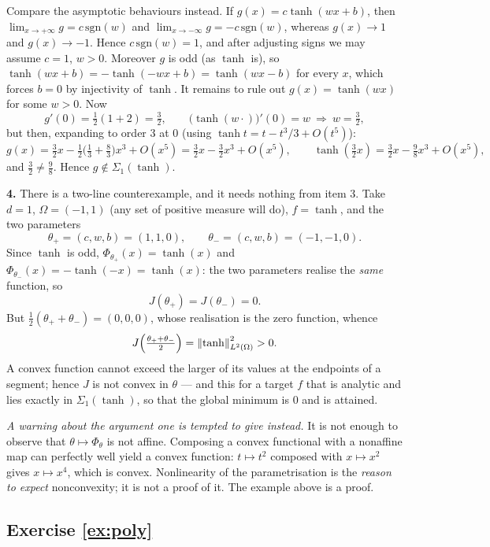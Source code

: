 \documentclass[11pt,a4paper]{article}
\begin{document}
Compare the asymptotic behaviours instead. If $g(x) = c\tanh(wx+b)$, then
$\lim_{x\to+\infty} g = c\,\mathrm{sgn}(w)$ and $\lim_{x \to -\infty} g = -c\,\mathrm{sgn}(w)$,
whereas $g(x) \to 1$ and $g(x) \to -1$. Hence $c\,\mathrm{sgn}(w) = 1$, and after adjusting signs we
may assume $c = 1$, $w > 0$. Moreover $g$ is odd (as $\tanh$ is), so
$\tanh(wx+b) = -\tanh(-wx+b) = \tanh(wx - b)$ for every $x$, which forces $b = 0$ by injectivity of
$\tanh$. It remains to rule out $g(x) = \tanh(wx)$ for some $w > 0$. Now
\[
g'(0) = \tfrac12(1 + 2) = \tfrac32, \qquad \big(\tanh(w\cdot)\big)'(0) = w \ \Longrightarrow\ w = \tfrac32,
\]
but then, expanding to order $3$ at $0$ (using $\tanh t = t - t^3/3 + O(t^5)$):
\[
g(x) = \tfrac32 x - \tfrac12\big(\tfrac{1}{3} + \tfrac{8}{3}\big) x^3 + O(x^5) = \tfrac32 x - \tfrac32 x^3 + O(x^5),
\qquad
\tanh(\tfrac32 x) = \tfrac32 x - \tfrac{9}{8}x^3 + O(x^5),
\]
and $\tfrac32 \ne \tfrac98$. Hence $g \notin \Sigma_1(\tanh)$.

\textbf{4.} There is a two-line counterexample, and it needs nothing from item 3. Take $d = 1$,
$\Omega = (-1,1)$ (any set of positive measure will do), $f = \tanh$, and the two parameters
\[
\theta_+ = (c,w,b) = (1,1,0), \qquad \theta_- = (c,w,b) = (-1,-1,0).
\]
Since $\tanh$ is odd, $\Phi_{\theta_+}(x) = \tanh(x)$ and
$\Phi_{\theta_-}(x) = -\tanh(-x) = \tanh(x)$: the two parameters realise the \emph{same} function,
so
\[
J(\theta_+) = J(\theta_-) = 0 .
\]
But $\tfrac12(\theta_+ + \theta_-) = (0,0,0)$, whose realisation is the zero function, whence
\[
J\Big( \tfrac{\theta_+ + \theta_-}{2} \Big) = \left\lVert \tanh \right\rVert_{L^2(\Omega)}^2 > 0 .
\]
A convex function cannot exceed the larger of its values at the endpoints of a segment; hence $J$ is
not convex in $\theta$ --- and this for a target $f$ that is analytic and lies exactly in
$\Sigma_1(\tanh)$, so that the global minimum is $0$ and is attained.

\emph{A warning about the argument one is tempted to give instead.} It is not enough to observe that
$\theta \mapsto \Phi_\theta$ is not affine. Composing a convex functional with a nonaffine map can
perfectly well yield a convex function: $t \mapsto t^2$ composed with $x \mapsto x^2$ gives
$x \mapsto x^4$, which is convex. Nonlinearity of the parametrisation is the \emph{reason to
expect} nonconvexity; it is not a proof of it. The example above is a proof.

\subsection*{Exercise \ref{ex:poly}}
\end{document}
